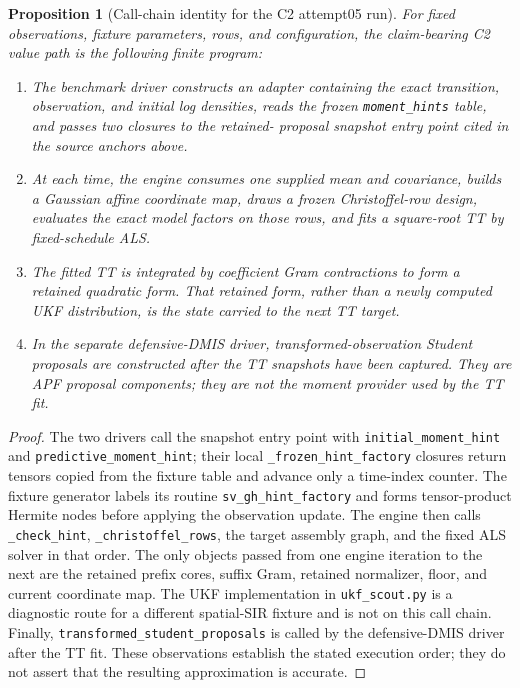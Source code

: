 \documentclass[11pt]{article}
\newtheorem{proposition}{Proposition}
\begin{document}
\begin{proposition}[Call-chain identity for the C2 attempt05 run]
\label{prop:actual-call-chain}
For fixed observations, fixture parameters, rows, and configuration, the
claim-bearing C2 value path is the following finite program:

\begin{enumerate}
\item The benchmark driver constructs an adapter containing the exact
  transition, observation, and initial log densities, reads the frozen
  \texttt{moment\_hints} table, and passes two closures to the retained-
  proposal snapshot entry point cited in the source anchors above.
\item At each time, the engine consumes one supplied mean and covariance,
  builds a Gaussian affine coordinate map, draws a frozen Christoffel-row
  design, evaluates the exact model factors on those rows, and fits a
  square-root TT by fixed-schedule ALS.
\item The fitted TT is integrated by coefficient Gram contractions to form a
  retained quadratic form.  That retained form, rather than a newly computed
  UKF distribution, is the state carried to the next TT target.
\item In the separate defensive-DMIS driver, transformed-observation Student
  proposals are constructed \emph{after} the TT snapshots have been captured.
  They are APF proposal components; they are not the moment provider used by
  the TT fit.
\end{enumerate}
\end{proposition}

\begin{proof}
The two drivers call the snapshot entry point with
\texttt{initial\_moment\_hint} and \texttt{predictive\_moment\_hint}; their local
\texttt{\_frozen\_hint\_factory} closures return tensors copied from the fixture
table and advance only a time-index counter.  The fixture generator labels its
routine \texttt{sv\_gh\_hint\_factory} and forms tensor-product Hermite nodes
before applying the observation update.  The engine then calls
\texttt{\_check\_hint}, \texttt{\_christoffel\_rows}, the target assembly graph, and
the fixed ALS solver in that order.  The only objects passed from one engine
iteration to the next are the retained prefix cores, suffix Gram, retained
  normalizer, floor, and current coordinate map.  The UKF implementation in
\texttt{ukf\_scout.py} is a diagnostic route for a different
spatial-SIR fixture and is not on this call chain.  Finally,
\texttt{transformed\_student\_proposals} is called by the defensive-DMIS driver
after the TT fit.  These observations establish the stated execution order;
they do not assert that the resulting approximation is accurate.
\end{proof}
\end{document}
